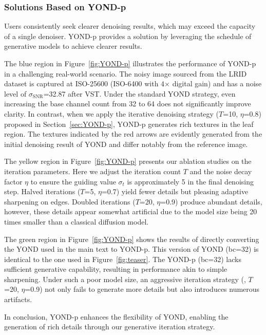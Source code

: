 \documentclass[lettersize,journal]{IEEEtran}
\begin{document}
\subsubsection{\textbf{Solutions Based on YOND-p}}\label{sec:discuss_YOND-p}
Users consistently seek clearer denoising results, which may exceed the capacity of a single denoiser. YOND-p provides a solution by leveraging the schedule of generative models to achieve clearer results.

The blue region in Figure~\ref{fig:YOND-p} illustrates the performance of YOND-p in a challenging real-world scenario. The noisy image sourced from the LRID dataset is captured at ISO-25600 (ISO-6400 with 4$\times$ digital gain) and has a noise level of $\sigma_{\text{SNR}}$=32.87 after VST. Under the standard YOND strategy, even increasing the base channel count from 32 to 64 does not significantly improve clarity. In contrast, when we apply the iterative denoising strategy ($T$=10, $\eta$=0.8) proposed in Section~\ref{sec:YOND-p}, YOND-p generates rich textures in the leaf region. The textures indicated by the red arrows are evidently generated from the initial denoising result of YOND and differ notably from the reference image.

The yellow region in Figure~\ref{fig:YOND-p} presents our ablation studies on the iteration parameters. Here we adjust the iteration count $T$ and the noise decay factor $\eta$ to ensure the guiding value $\sigma_{t}$ is approximately 5 in the final denoising step. Halved iterations ($T$=5, $\eta$=0.7) yield fewer details but pleasing adaptive sharpening on edges. Doubled iterations ($T$=20, $\eta$=0.9) produce abundant details, however, these details appear somewhat artificial due to the model size being 20 times smaller than a classical diffusion model.

The green region in Figure~\ref{fig:YOND-p} shows the results of directly converting the YOND used in the main text to YOND-p. This version of YOND (bc=32) is identical to the one used in Figure~\ref{fig:teaser}. The YOND-p (bc=32) lacks sufficient generative capability, resulting in performance akin to simple sharpening. Under such a poor model size, an aggressive iteration strategy (\eg, $T$=20, $\eta$=0.9) not only fails to generate more details but also introduces numerous artifacts.

In conclusion, YOND-p enhances the flexibility of YOND, enabling the generation of rich details through our generative iteration strategy.
\end{document}
